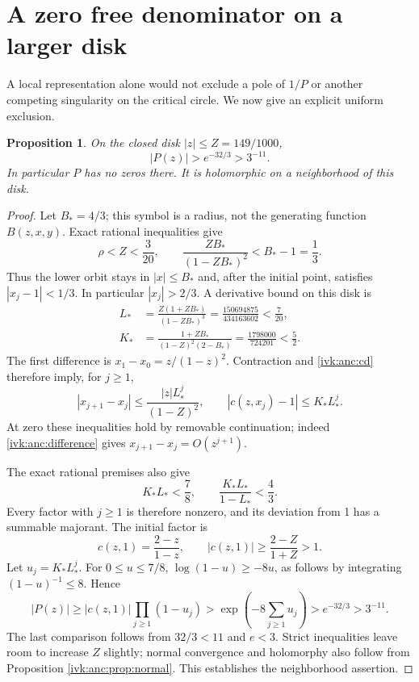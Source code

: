 \documentclass[11pt,letterpaper]{article}
\newtheorem{proposition}[theorem]{Proposition}
\theoremstyle{remark}\newtheorem{remark}[theorem]{Remark}
\begin{document}
\section{A zero free denominator on a larger disk}\label{ivk:anc:sec:zero}
A local representation alone would not exclude a pole of $1/P$ or
another competing singularity on the critical circle. We now give
an explicit uniform exclusion.

\begin{proposition}\label{ivk:anc:prop:zero}
On the closed disk $|z|\le Z=149/1000$,
\begin{equation}\label{ivk:anc:Pbound}
 |P(z)|>e^{-32/3}>3^{-11}.
\end{equation}
In particular $P$ has no zeros there. It is holomorphic on a
neighborhood of this disk.
\end{proposition}
\begin{proof}
Let $B_*=4/3$; this symbol is a radius, not the generating function
$B(z,x,y)$. Exact rational inequalities give
\begin{equation}\label{ivk:anc:zeroineq}
 \rho<Z<\frac3{20},\qquad
 \frac{ZB_*}{(1-ZB_*)^2}<B_*-1=\frac13.
\end{equation}
Thus the lower orbit stays in $|x|\le B_*$ and, after the initial
point, satisfies $|x_j-1|<1/3$. In particular $|x_j|>2/3$.
A derivative bound on this disk is
\begin{equation}\label{ivk:anc:LK}
 \begin{split}
 L_*&=\frac{Z(1+ZB_*)}{(1-ZB_*)^3}
       =\frac{150694875}{434163602}<\frac7{20},\\
 K_*&=\frac{1+ZB_*}{(1-Z)^2(2-B_*)}
       =\frac{1798000}{724201}<\frac52.
 \end{split}
\end{equation}
The first difference is $x_1-x_0=z/(1-z)^2$. Contraction and
\eqref{ivk:anc:cd} therefore imply, for $j\ge1$,
\begin{equation}\label{ivk:anc:cfactors}
 |x_{j+1}-x_j|\le\frac{|z|L_*^j}{(1-Z)^2},\qquad
 |c(z,x_j)-1|\le K_*L_*^j.
\end{equation}
At zero these inequalities hold by removable continuation; indeed
\eqref{ivk:anc:difference} gives $x_{j+1}-x_j=O(z^{j+1})$.

The exact rational premises also give
\[
 K_*L_*<\frac78,\qquad
 \frac{K_*L_*}{1-L_*}<\frac43.
\]
Every factor with $j\ge1$ is therefore nonzero, and its deviation
from 1 has a summable majorant. The initial factor is
\[
 c(z,1)=\frac{2-z}{1-z},\qquad
 |c(z,1)|\ge\frac{2-Z}{1+Z}>1.
\]
Let $u_j=K_*L_*^j$. For $0\le u\le7/8$,
$\log(1-u)\ge-8u$, as follows by integrating
$(1-u)^{-1}\le8$. Hence
\[
 |P(z)|\ge |c(z,1)|\prod_{j\ge1}(1-u_j)
 >\exp\left(-8\sum_{j\ge1}u_j\right)
 >e^{-32/3}>3^{-11}.
\]
The last comparison follows from $32/3<11$ and $e<3$.
Strict inequalities leave room to increase $Z$ slightly; normal
convergence and holomorphy also follow from Proposition
\ref{ivk:anc:prop:normal}. This establishes the neighborhood assertion.
\end{proof}
\end{document}
